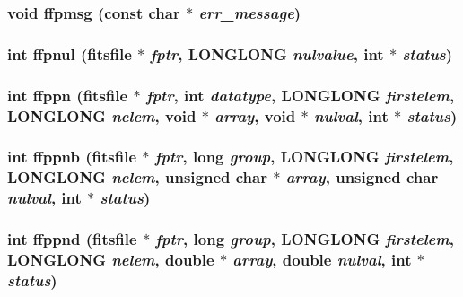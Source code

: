 \subsubsection{\setlength{\rightskip}{0pt plus 5cm}void ffpmsg (const char $\ast$ {\em err\_\-message})}\label{fitsio__64_8h_9db26b27c3c6d7589c44565df739c3d5}


\subsubsection{\setlength{\rightskip}{0pt plus 5cm}int ffpnul (\bf{fitsfile} $\ast$ {\em fptr}, \bf{LONGLONG} {\em nulvalue}, int $\ast$ {\em status})}\label{fitsio__64_8h_611f557254bffac18cb113388849944a}


\subsubsection{\setlength{\rightskip}{0pt plus 5cm}int ffppn (\bf{fitsfile} $\ast$ {\em fptr}, int {\em datatype}, \bf{LONGLONG} {\em firstelem}, \bf{LONGLONG} {\em nelem}, void $\ast$ {\em array}, void $\ast$ {\em nulval}, int $\ast$ {\em status})}\label{fitsio__64_8h_03027451cf6719b0ff4ffb8c6659b2a2}


\subsubsection{\setlength{\rightskip}{0pt plus 5cm}int ffppnb (\bf{fitsfile} $\ast$ {\em fptr}, long {\em group}, \bf{LONGLONG} {\em firstelem}, \bf{LONGLONG} {\em nelem}, unsigned char $\ast$ {\em array}, unsigned char {\em nulval}, int $\ast$ {\em status})}\label{fitsio__64_8h_38152248c04b8b4ff9f813cd636013a4}


\subsubsection{\setlength{\rightskip}{0pt plus 5cm}int ffppnd (\bf{fitsfile} $\ast$ {\em fptr}, long {\em group}, \bf{LONGLONG} {\em firstelem}, \bf{LONGLONG} {\em nelem}, double $\ast$ {\em array}, double {\em nulval}, int $\ast$ {\em status})}\label{fitsio__64_8h_dbce44e4863160818dafc8a7e74df364}


